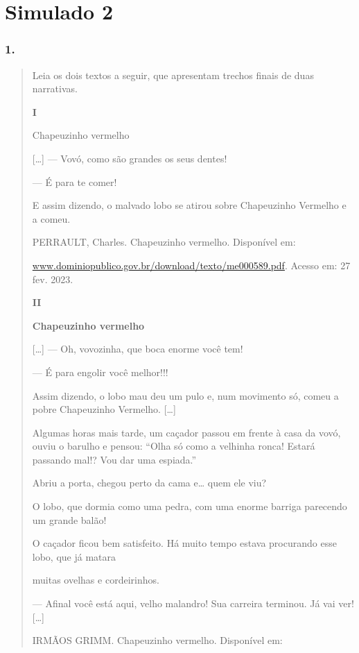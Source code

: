 \section{Simulado 2}\label{simulado-2}

\subsubsection{1. }\label{section-84}

\begin{quote}
Leia os dois textos a seguir, que apresentam trechos finais de duas
narrativas.

\textbf{I}

Chapeuzinho vermelho

{[}\ldots{}{]} --- Vovó, como são grandes os seus dentes!

--- É para te comer!

E assim dizendo, o malvado lobo se atirou sobre Chapeuzinho Vermelho e a
comeu.

PERRAULT, Charles. Chapeuzinho vermelho. Disponível em:

\href{http://www.dominiopublico.gov.br/download/texto/me000589.pdf}{www.dominiopublico.gov.br/download/texto/me000589.pdf}.
Acesso em: 27 fev. 2023.

\textbf{II}

\textbf{Chapeuzinho vermelho}

{[}\ldots{}{]} --- Oh, vovozinha, que boca enorme você tem!

--- É para engolir você melhor!!!

Assim dizendo, o lobo mau deu um pulo e, num movimento só, comeu a pobre
Chapeuzinho Vermelho. {[}\ldots{}{]}

Algumas horas mais tarde, um caçador passou em frente à casa da vovó,
ouviu o barulho e pensou: ``Olha só como a velhinha ronca! Estará
passando mal!? Vou dar uma espiada.''

Abriu a porta, chegou perto da cama e\ldots{} quem ele viu?

O lobo, que dormia como uma pedra, com uma enorme barriga parecendo um
grande balão!

O caçador ficou bem satisfeito. Há muito tempo estava procurando esse
lobo, que já matara

muitas ovelhas e cordeirinhos.

--- Afinal você está aqui, velho malandro! Sua carreira terminou. Já vai
ver! {[}\ldots{}{]}

IRMÃOS GRIMM. Chapeuzinho vermelho. Disponível em:


\end{quote}
